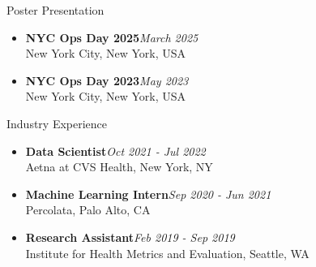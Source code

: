 \documentclass{resume} %
\begin{document}
\begin{rSection}{Poster Presentation}
\begin{itemize}
\item {\bf NYC Ops Day 2025}\hfill {\em March 2025}\\
New York City, New York, USA
\item {\bf NYC Ops Day 2023}\hfill {\em May 2023}\\
New York City, New York, USA
\end{itemize}
\end{rSection}

\begin{rSection}{Industry Experience}
\begin{itemize}
\item {\bf Data Scientist}\hfill {\em Oct 2021 - Jul 2022}\\
Aetna at CVS Health, New York, NY
\item {\bf Machine Learning Intern}\hfill {\em Sep 2020 - Jun 2021}\\
Percolata, Palo Alto, CA
\item {\bf Research Assistant}\hfill {\em Feb 2019 - Sep 2019}\\
Institute for Health Metrics and Evaluation, Seattle, WA
\end{itemize}
\end{rSection}
\end{document}
